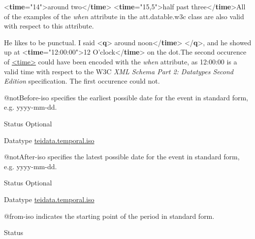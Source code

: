 \begin{reflist}
\begin{sansreflist}
\begin{reflist}
{<\textbf{time}\hspace*{1em}{when-iso}="{14}">}around two{</\textbf{time}>}\mbox{}\newline 
{<\textbf{time}\hspace*{1em}{when-iso}="{15,5}">}half past three{</\textbf{time}>}All of the examples of the {\itshape when} attribute in the \textsf{att.datable.w3c} class are also valid with respect to this attribute.
    \item[]\exampleFont He likes to be punctual. I said {<\textbf{q}>}\mbox{}\newline 
{}around noon{</\textbf{time}>}\mbox{}\newline 
{</\textbf{q}>}, and he showed up at {<\textbf{time}\hspace*{1em}{when-iso}="{12:00:00}">}12 O'clock{</\textbf{time}>} on the dot.The second occurence of \hyperref[TEI.time]{<time>} could have been encoded with the {\itshape when} attribute, as 12:00:00 is a valid time with respect to the W3C \textit{XML Schema Part 2: Datatypes Second Edition} specification. The first occurence could not.
\end{reflist}  
    \item[@notBefore-iso]
  specifies the earliest possible date for the event in standard form, e.g. yyyy-mm-dd.
\begin{reflist}
    \item[{Status}]
  Optional
    \item[{Datatype}]
  \hyperref[TEI.teidata.temporal.iso]{teidata.temporal.iso}
\end{reflist}  
    \item[@notAfter-iso]
  specifies the latest possible date for the event in standard form, e.g. yyyy-mm-dd.
\begin{reflist}
    \item[{Status}]
  Optional
    \item[{Datatype}]
  \hyperref[TEI.teidata.temporal.iso]{teidata.temporal.iso}
\end{reflist}  
    \item[@from-iso]
  indicates the starting point of the period in standard form.
\begin{reflist}
    \item[{Status}]

\end{reflist}
\end{sansreflist}
\end{reflist}
